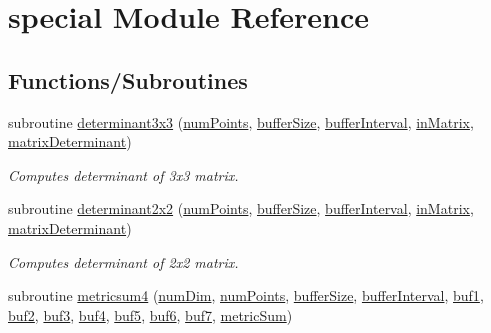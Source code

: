 \hypertarget{namespacespecial}{}\section{special Module Reference}
\label{namespacespecial}
\subsection*{Functions/\+Subroutines}
\begin{DoxyCompactItemize}
\item 
subroutine \hyperlink{namespacespecial_ab519d39d1e9c73cc816de9bac48f1160}{determinant3x3} (\hyperlink{ViscidKernels_8H_adf0bf75d0875d1bb42a5348bee7b7bfd}{num\+Points}, \hyperlink{SpecialKernels_8H_aa9426cdf16e85054db35e88f9b68c6be}{buffer\+Size}, \hyperlink{WENOKernels_8H_ad1001168d5432b52e6d0636f4dc0e60c}{buffer\+Interval}, \hyperlink{SpecialKernels_8H_aacec8fb16540ff8822123643cc0a8ac7}{in\+Matrix}, \hyperlink{SpecialKernels_8H_a78525fd0fb580fe08dba21a167ba4ac1}{matrix\+Determinant})
\begin{DoxyCompactList}\small\item\em Computes determinant of 3x3 matrix. \end{DoxyCompactList}\item 
subroutine \hyperlink{namespacespecial_ac4a36999d6e685473f363175905ad019}{determinant2x2} (\hyperlink{ViscidKernels_8H_adf0bf75d0875d1bb42a5348bee7b7bfd}{num\+Points}, \hyperlink{SpecialKernels_8H_aa9426cdf16e85054db35e88f9b68c6be}{buffer\+Size}, \hyperlink{WENOKernels_8H_ad1001168d5432b52e6d0636f4dc0e60c}{buffer\+Interval}, \hyperlink{SpecialKernels_8H_aacec8fb16540ff8822123643cc0a8ac7}{in\+Matrix}, \hyperlink{SpecialKernels_8H_a78525fd0fb580fe08dba21a167ba4ac1}{matrix\+Determinant})
\begin{DoxyCompactList}\small\item\em Computes determinant of 2x2 matrix. \end{DoxyCompactList}\item 
subroutine \hyperlink{namespacespecial_a35dc32e6088894d25d79ce222235792c}{metricsum4} (\hyperlink{SATKernels_8H_a680185db8546de161968dabace9e94f1}{num\+Dim}, \hyperlink{ViscidKernels_8H_adf0bf75d0875d1bb42a5348bee7b7bfd}{num\+Points}, \hyperlink{SpecialKernels_8H_aa9426cdf16e85054db35e88f9b68c6be}{buffer\+Size}, \hyperlink{WENOKernels_8H_ad1001168d5432b52e6d0636f4dc0e60c}{buffer\+Interval}, \hyperlink{SpecialKernels_8H_a595273dc3902920c0056b8a1ef9bff5e}{buf1}, \hyperlink{SpecialKernels_8H_ab3bc18ad1957d5cb9c2b612e89df900d}{buf2}, \hyperlink{SpecialKernels_8H_abcaabc21103d12066791d03652cf9d07}{buf3}, \hyperlink{SpecialKernels_8H_aa0bc16bfee801837492416db85dff90c}{buf4}, \hyperlink{SpecialKernels_8H_a1d9b2cc88189869440b6641628dea8a9}{buf5}, \hyperlink{SpecialKernels_8H_a1ecfdf27819102af6ccae0762e607308}{buf6}, \hyperlink{SpecialKernels_8H_a8562dabe2a78d45593422b8b1e4ef513}{buf7}, \hyperlink{SpecialKernels_8H_a0340a724362a31a98b845deab71cda83}{metric\+Sum})

\end{DoxyCompactItemize}

